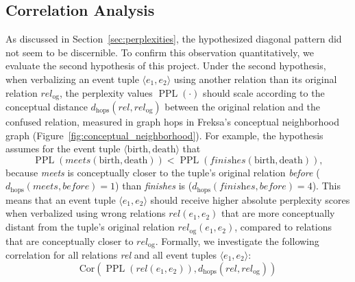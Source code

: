 \documentclass[11pt]{article}
\DeclareMathOperator{\PPL}{PPL}
\begin{document}
\subsection{Correlation Analysis}
As discussed in Section~\ref{sec:perplexities}, the hypothesized diagonal pattern did not seem to be discernible. To confirm this observation quantitatively, we evaluate the second hypothesis of this project. Under the second hypothesis, when verbalizing an event tuple $\langle e_1, e_2 \rangle$ using another relation than its original relation $\textit{rel}_\text{og}$, the perplexity values $\PPL(\cdot)$ should scale according to the conceptual distance $d_\text{hops}(\textit{rel}, \textit{rel}_\text{og})$ between the original relation and the confused relation, measured in graph hops in Freksa's conceptual neighborhood graph (Figure~\ref{fig:conceptual_neighborhood}). For example, the hypothesis assumes for the event tuple $\langle \text{birth}, \text{death} \rangle$ that
\begin{equation}
  \PPL(\textit{meets}(\text{birth}, \text{death})) < \PPL(\textit{finishes}(\text{birth}, \text{death})),
\end{equation}
because \textit{meets} is conceptually closer to the tuple's original relation \textit{before} ($d_\text{hops}(\textit{meets}, \textit{before}) = 1$) than \textit{finishes} is ($d_\text{hops}(\textit{finishes}, \textit{before}) = 4$).
This means that an event tuple $\langle e_1, e_2 \rangle$ should receive higher absolute perplexity scores when verbalized using wrong relations $\textit{rel}(e_1, e_2)$ that are more conceptually distant from the tuple's original relation $\textit{rel}_\text{og}(e_1, e_2)$, compared to relations that are conceptually closer to $\textit{rel}_\text{og}$. Formally, we investigate the following correlation for all relations \textit{rel} and all event tuples $\langle e_1, e_2\rangle$:
\begin{equation}
  \text{Cor}\left(\PPL(\textit{rel}(e_1, e_2)), d_\text{hops}(\textit{rel}, \textit{rel}_\text{og}) \right)
\end{equation}
\end{document}
